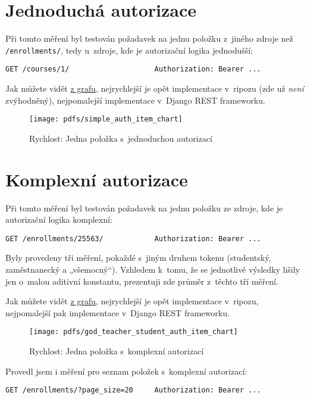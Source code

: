 \section{Jednoduchá autorizace}\label{jednoduchuxe1-autorizace}

Při tomto měření byl testován požadavek na jednu položku z~jiného zdroje než \verb!/enrollments/!, tedy u~zdroje, kde je autorizační logika jednodušší:

\verb!GET /courses/1/                    Authorization: Bearer ...!

Jak můžete vidět \protect\hyperlink{pic:simple:auth:item:chart}{z grafu}, nejrychlejší je opět implementace v~ripozu (zde už \emph{není} zvýhodněný), nejpomalejší implementace v~Django REST frameworku.

\begin{figure}
\centering
\texttt{[image: pdfs/simple\_auth\_item\_chart]}
\caption{Rychlost: Jedna položka s~jednoduchou autorizací\label{pic:simple:auth:item:chart}}
\end{figure}

\section{Komplexní autorizace}\label{komplexnuxed-autorizace}

Při tomto měření byl testován požadavek na jednu položku ze zdroje, kde je autorizační logika komplexní:

\verb!GET /enrollments/25563/            Authorization: Bearer ...!

Byly provedeny tři měření, pokaždé s~jiným druhem tokenu (studentský, zaměstnanecký a „všemocný“). Vzhledem k~tomu, že se jednotlivé výsledky lišily jen o~malou aditivní konstantu, prezentuji zde průměr z~těchto tří měření.

Jak můžete vidět \protect\hyperlink{pic:god:teacher:student:auth:item:chart}{z grafu}, nejrychlejší je opět implementace v~ripozu, nejpomalejší pak implementace v~Django REST frameworku.

\begin{figure}
\centering
\texttt{[image: pdfs/god\_teacher\_student\_auth\_item\_chart]}
\caption{Rychlost: Jedna položka s~komplexní autorizací\label{pic:god:teacher:student:auth:item:chart}}
\end{figure}

Provedl jsem i měření pro seznam položek s~komplexní autorizací:

\verb!GET /enrollments/?page_size=20     Authorization: Bearer ...!

